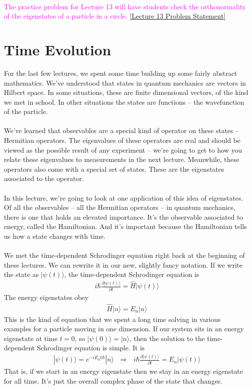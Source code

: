 \documentclass[12pt]{article}
\def\be{\begin{eqnarray}}
\def\ee{\end{eqnarray}}
\newcommand{\nn}{\nonumber}
\newcommand\para{\paragraph{}}
\newcommand{\ppp}[2]{\frac{\partial {#1}}{\partial {#2}}}
\newcommand{\ket}[1]{|#1\rangle}
\newcommand{\co}{\color{olive}}
\newcommand{\alyssa}{\textcolor{magenta}}
\begin{document}
{\para
\alyssa{The practice problem for Lecture 13 will have students check the orthonormality of the eigenstates of a particle in a circle.} \href{https://drive.google.com/file/d/13x8lddNRo6ANECz4AoY_vG4KdxirXCWn/view?usp=drive_link}{[Lecture 13 Problem Statement]}


 

\newpage
\section{Time Evolution}

For the last few lectures, we spent some time building up some fairly abstract mathematics. We've understood that states in quantum mechanics are vectors in Hilbert space. In some situations,  these are finite dimensional vectors, of the kind we met in school. In other situations the states are functions -- the wavefunction of the particle.

\para
We've learned that observables are a special kind of operator on these states -- Hermitian operators. The eigenvalues of these operators are real and should be viewed as the possible result of any experiment -- we're going to get to how you relate these eigenvalues to measurements in the next lecture. Meanwhile, these operators also come with a special set of states. These are the eigenstates associated to the operator.

\para
In this lecture, we're going to look at one application of this idea of eigenstates. Of all the observables -- all the Hermitian operators -- in quantum mechanics, there is one that holds an elevated importance. It's the observable associated to energy, called the Hamiltonian. And it's important because the Hamiltonian tells us how a state changes with time. 



\para
We met the time-dependent Schrodinger equation right back at the beginning of these lectures. We can rewrite it  in our new, slightly fancy notation. {\co If we write the state as $\ket{\psi(t)}$, the time-dependent Schrodinger equation is
%
\be i\hbar\ppp{\ket{\psi(t)}}{t} = \hat{H}\ket{\psi(t)}\nn\ee
%
The energy eigenstates obey
%
\be \hat{H} \ket{n} = E_n\ket{n}\nn\ee
%
} This is the kind of equation that we spent a long time solving in various examples for a particle moving in one dimension. {\co If our system sits in an energy eigenstate at time $t=0$, so $\ket{\psi(0)} = \ket{n}$, then the solution to the time-dependent Schrodinger equation is simple. It is
%
\be \ket{\psi(t)} = e^{-iE_n t\hbar} \ket{n}\ \ \ \Longrightarrow \ \ \   i\hbar\ppp{\ket{\psi(t)}}{t} = E_n\ket{\psi(t)}\nn\ee
%
} That is, if we start in an energy eigenstate then we stay in an energy eigenstate for all time. It's just the overall complex phase of the state that changes. 

}
\end{document}
